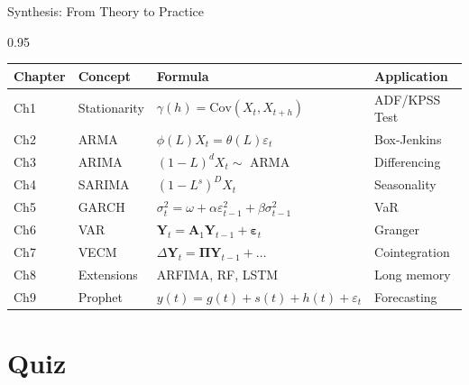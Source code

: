 \documentclass[9pt, aspectratio=169, t]{beamer}
\begin{document}
\begin{frame}{Synthesis: From Theory to Practice}
    \begin{cminipage}{0.95\textwidth}
        {\tiny
        \begin{center}
        \begin{tabular}{@{}l l l l@{}}
            \toprule
            \textbf{Chapter} & \textbf{Concept} & \textbf{Formula} & \textbf{Application} \\
            \midrule
            Ch1 & Stationarity & $\gamma(h) = \text{Cov}(X_t, X_{t+h})$ & ADF/KPSS Test \\
            Ch2 & ARMA & $\phi(L)X_t = \theta(L)\varepsilon_t$ & Box-Jenkins \\
            Ch3 & ARIMA & $(1-L)^d X_t \sim$ ARMA & Differencing \\
            Ch4 & SARIMA & $(1-L^s)^D X_t$ & Seasonality \\
            Ch5 & GARCH & $\sigma_t^2 = \omega + \alpha\varepsilon_{t-1}^2 + \beta\sigma_{t-1}^2$ & VaR \\
            Ch6 & VAR & $\mathbf{Y}_t = \mathbf{A}_1\mathbf{Y}_{t-1} + \boldsymbol{\varepsilon}_t$ & Granger \\
            Ch7 & VECM & $\Delta\mathbf{Y}_t = \boldsymbol{\Pi}\mathbf{Y}_{t-1} + \ldots$ & Cointegration \\
            Ch8 & Extensions & ARFIMA, RF, LSTM & Long memory \\
            Ch9 & Prophet & $y(t) = g(t) + s(t) + h(t) + \varepsilon_t$ & Forecasting \\
            \bottomrule
        \end{tabular}
        \end{center}
        }
    \end{cminipage}
\end{frame}

\section{Quiz}
\end{document}

